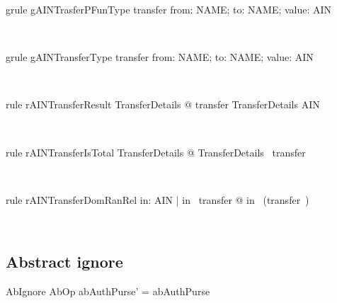\begin{LGRT}
\begin{theorem}{grule gAINTrasferPFunType}
    transfer \in  \lblot from: NAME; to: NAME; value: \nat \rblot  \pfun  AIN
\end{theorem}~\end{LGRT}

\begin{LGRT}
\begin{theorem}{grule gAINTransferType}
    transfer \in  \lblot from: NAME; to: NAME; value: \nat \rblot  \pinj  AIN
\end{theorem}~\end{LGRT}

\begin{LRRT}
\begin{theorem}{rule rAINTransferResult}
    \forall  TransferDetails @ transfer \theta  TransferDetails \in  AIN
\end{theorem}~\end{LRRT}

\begin{LRRT}
\begin{theorem}{rule rAINTransferIsTotal}
    \forall  TransferDetails @ \theta  TransferDetails \in  \dom~transfer
\end{theorem}~\end{LRRT}

\begin{LRRT}
\begin{theorem}{rule rAINTransferDomRanRel}
    \forall  in: AIN | in \in  \ran~transfer @ in \in  \dom~(transfer~\inv)
\end{theorem}~\end{LRRT}

\subsection{Abstract ignore}

\begin{LSDef}
\begin{schema}{AbIgnore}
   AbOp
\where
   abAuthPurse' = abAuthPurse
\end{schema}~\end{LSDef}

